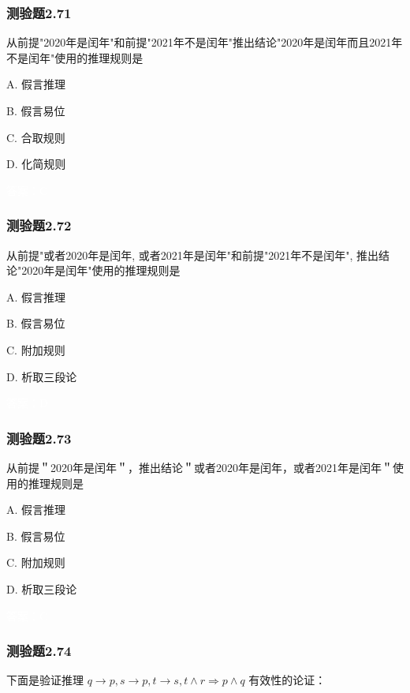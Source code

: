 \documentclass[UTF8, heading=true]{ctexart}
\begin{document}
\subsubsection{测验题2.71}

从前提"2020年是闰年"和前提"2021年不是闰年"推出结论"2020年是闰年而且2021年不是闰年"使用的推理规则是

A. 假言推理

B. 假言易位

C. 合取规则

D. 化简规则

\textcolor{white}{答案：C}

\subsubsection{测验题2.72}

从前提"或者2020年是闰年, 或者2021年是闰年"和前提"2021年不是闰年", 推出结论"2020年是闰年"使用的推理规则是

A. 假言推理

B. 假言易位

C. 附加规则

D. 析取三段论

\textcolor{white}{答案：D}

\subsubsection{测验题2.73}

从前提＂2020年是闰年＂，推出结论＂或者2020年是闰年，或者2021年是闰年＂使用的推理规则是 $\qquad$

A. 
假言推理

B. 
假言易位

C. 
附加规则

D.  
析取三段论

\textcolor{white}{答案：C}

\subsubsection{测验题2.74}

下面是验证推理 $q \rightarrow p, s \rightarrow p, t \rightarrow s, t \wedge r \Longrightarrow p \wedge q$ 有效性的论证：

\clearpage
\end{document}
